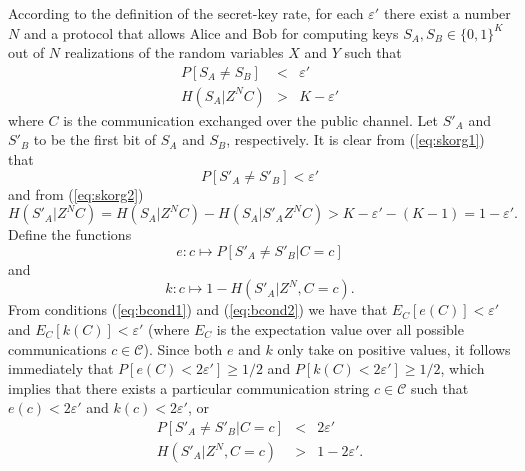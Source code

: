 \documentclass{article}
\begin{document}
\proof
  According to the definition of the secret-key rate, for each
  $\varepsilon'$ there exist a number $N$ and a protocol that allows
  Alice and Bob for computing keys $S_A, S_B \in \{0,1\}^K$ out of
  $N$ realizations of the random variables $X$ and $Y$ such that
  \begin{eqnarray}
    P[S_A \neq S_B] & < & \varepsilon' \label{eq:skorg1} \\
    H(S_A | Z^N C) & > & K - \varepsilon' \label{eq:skorg2}
  \end{eqnarray}
  where $C$ is the communication exchanged over the public channel.
  Let  $S'_A$ and $S'_B$ to be the
  first bit of $S_A$ and $S_B$, respectively. It is clear from
  (\ref{eq:skorg1}) that
  \begin{equation} \label{eq:bcond1}
    P[S'_A \neq S'_B] < \varepsilon' 
  \end{equation}
  and from (\ref{eq:skorg2})
  \begin{equation} \label{eq:bcond2}
    H(S'_A | Z^N C) = H(S_A | Z^N C) - H(S_A | S'_A Z^N C) 
      > K - \varepsilon' - (K-1) = 1- \varepsilon'.
  \end{equation}
  Define the functions
  \begin{equation}
    e: c \mapsto P[S'_A \neq S'_B | C=c]
  \end{equation}
  and 
  \begin{equation}
    k:  c \mapsto 1- H(S'_A | Z^N, C=c).
  \end{equation}
  From conditions (\ref{eq:bcond1}) and (\ref{eq:bcond2}) we have that
  $E_C[e(C)] < \varepsilon'$ and $E_C[k(C)] < \varepsilon'$ (where
  $E_C$ is the expectation value over all possible communications $c \in
  \mathcal{C}$). Since both $e$ and $k$ only take on positive values,
  it follows immediately that $P[e(C) < 2\varepsilon']\geq 1/2$ and
  $P[k(C) < 2\varepsilon']\geq 1/2$, which implies that there exists a
  particular communication string 
$c \in \mathcal{C}$ such that $e(c) < 2\varepsilon'$
  and $k(c) < 2\varepsilon'$, or
  \begin{eqnarray} 
    P[S'_A \neq S'_B | C=c] & < & 2 \varepsilon' \label{eq:optc1} \\
    H(S'_A | Z^N, C=c) & > & 1-2\varepsilon' \label{eq:optc2}.
  \end{eqnarray}
  
\end{document}
